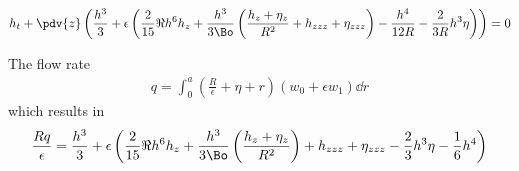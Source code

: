 \documentclass[12pt]{article}
\begin{document}
\begin{align}
h_t + \pdv{z}\left(\frac{h^3}{3} +\epsilon\left(\frac{2}{15}\Re h^6 h_z + \frac{h^3}{3\Bo}\left(\frac{h_z+ \eta_z}{R^2} + h_{zzz}+ \eta_{zzz}\right)- \frac{h^4}{12R}- \frac{2}{3R}h^3\eta\right)\right)=0
\end{align}

The flow rate 
\begin{align}
q = \int_{0}^{a}{\left(\frac{R}{\epsilon}+\eta+r\right)(w_0 + \epsilon w_1)\dd{r}}
\end{align}
which results in 
\begin{align}
\frac{Rq}{\epsilon} = \frac{h^3}{3}+\epsilon\left(\frac{2}{15}\Re h^6h_z + \frac{h^3}{3\Bo}\left(\frac{h_z+\eta_z}{R^2}\right)+h_{zzz} + \eta_{zzz}- \frac{2}{3}h^3\eta-\frac{1}{6}h^4\right)
\end{align}



\end{document}
